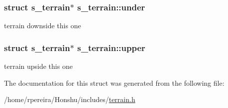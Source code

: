 \subsubsection[{\texorpdfstring{under}{under}}]{\setlength{\rightskip}{0pt plus 5cm}struct {\bf s\+\_\+terrain}$\ast$ s\+\_\+terrain\+::under}\hypertarget{structs__terrain_a68c60ddeb2843fde86c0a312acf376de}{}\label{structs__terrain_a68c60ddeb2843fde86c0a312acf376de}
terrain downside this one 
\subsubsection[{\texorpdfstring{upper}{upper}}]{\setlength{\rightskip}{0pt plus 5cm}struct {\bf s\+\_\+terrain}$\ast$ s\+\_\+terrain\+::upper}\hypertarget{structs__terrain_ac12bffa573ce425f612f6ce99b4b4f0f}{}\label{structs__terrain_ac12bffa573ce425f612f6ce99b4b4f0f}
terrain upside this one 

The documentation for this struct was generated from the following file\+:\begin{DoxyCompactItemize}
\item 
/home/rpereira/\+Honshu/includes/\hyperlink{terrain_8h}{terrain.\+h}\end{DoxyCompactItemize}
